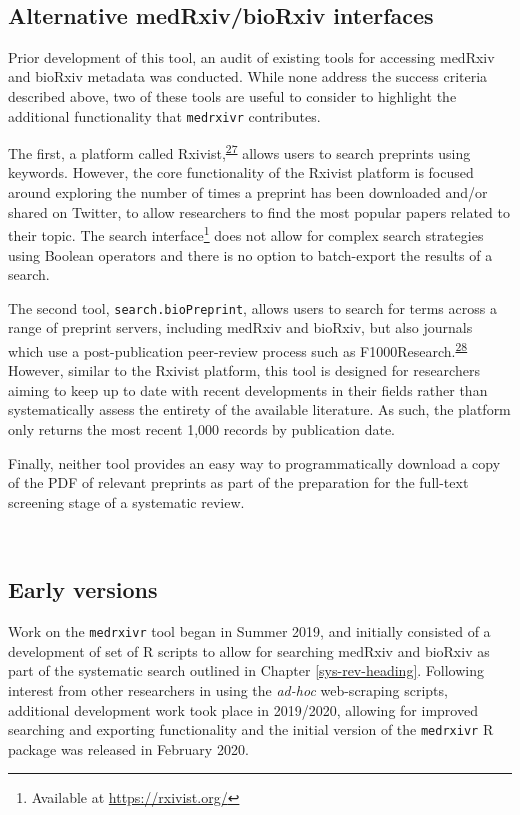 \documentclass[a4paper, twoside]{templates/ociamthesis}
\begin{document}
~

\hypertarget{alternative-medrxivbiorxiv-interfaces}{%
\subsection{Alternative medRxiv/bioRxiv interfaces}\label{alternative-medrxivbiorxiv-interfaces}}

Prior development of this tool, an audit of existing tools for accessing medRxiv and bioRxiv metadata was conducted. While none address the success criteria described above, two of these tools are useful to consider to highlight the additional functionality that \texttt{medrxivr} contributes.

The first, a platform called Rxivist,\textsuperscript{\protect\hyperlink{ref-abdill2019}{27}} allows users to search preprints using keywords. However, the core functionality of the Rxivist platform is focused around exploring the number of times a preprint has been downloaded and/or shared on Twitter, to allow researchers to find the most popular papers related to their topic. The search interface\footnote{Available at \url{https://rxivist.org/}} does not allow for complex search strategies using Boolean operators and there is no option to batch-export the results of a search.

The second tool, \texttt{search.bioPreprint}, allows users to search for terms across a range of preprint servers, including medRxiv and bioRxiv, but also journals which use a post-publication peer-review process such as F1000Research.\textsuperscript{\protect\hyperlink{ref-iwema2016}{28}} However, similar to the Rxivist platform, this tool is designed for researchers aiming to keep up to date with recent developments in their fields rather than systematically assess the entirety of the available literature. As such, the platform only returns the most recent 1,000 records by publication date.

Finally, neither tool provides an easy way to programmatically download a copy of the PDF of relevant preprints as part of the preparation for the full-text screening stage of a systematic review.

~

\hypertarget{early-versions}{%
\subsection{Early versions}\label{early-versions}}

Work on the \texttt{medrxivr} tool began in Summer 2019, and initially consisted of a development of set of R scripts to allow for searching medRxiv and bioRxiv as part of the systematic search outlined in Chapter \ref{sys-rev-heading}. Following interest from other researchers in using the \emph{ad-hoc} web-scraping scripts, additional development work took place in 2019/2020, allowing for improved searching and exporting functionality and the initial version of the \texttt{medrxivr} R package was released in February 2020.
\end{document}
